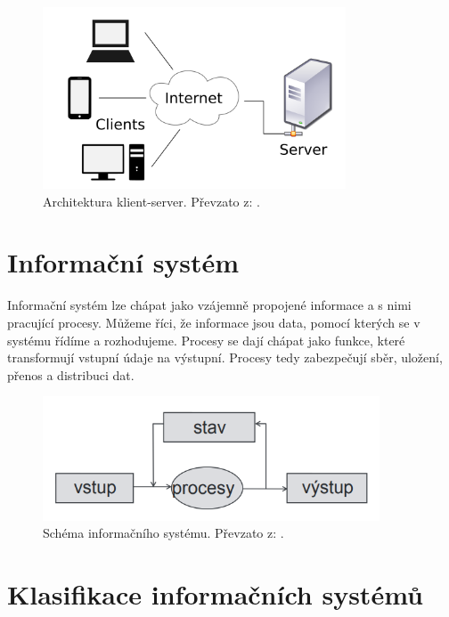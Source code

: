 \begin{figure}[H]
    \begin{center}
    \includegraphics[width=90mm]{obrazky-figures/cliserver.png}
    
    \caption{Architektura klient-server. Převzato z: \cite{clientimage}.}
\end{center}
\end{figure}


\section{Informační systém}

Informační systém lze chápat jako vzájemně propojené informace a s nimi pracující procesy. Můžeme říci, že informace jsou data, pomocí kterých se v systému řídíme a rozhodujeme. Procesy se dají chápat jako funkce, které transformují vstupní údaje na výstupní. Procesy tedy zabezpečují sběr, uložení, přenos a distribuci dat. \cite{is1} 

\begin{figure}[H]
    \centering
    \includegraphics[width=100mm]{obrazky-figures/is.png}
    
    \caption{Schéma informačního systému. Převzato z: \cite{isimage}.} 
    \label{fig:my_label}
\end{figure}


\section{Klasifikace informačních systémů}

